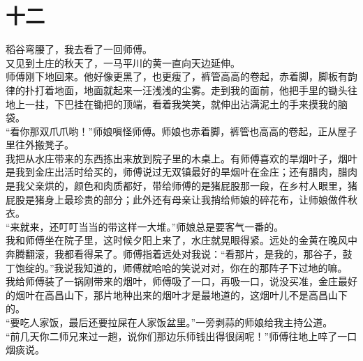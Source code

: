 \fancyhead[RO]{\thepage} %
\fancyhead[LE]{\thepage} %
\fancyfoot[LE,RO]{}
\fancyfoot[LO,CE]{}
\fancyfoot[CO,RE]{}
\chapter*{十二}
稻谷弯腰了，我去看了一回师傅。\\

又见到土庄的秋天了，一马平川的黄一直向天边延伸。\\

师傅刚下地回来。他好像更黑了，也更瘦了，裤管高高的卷起，赤着脚，脚板有韵律的扑打着地面，地面就起来一汪浅浅的尘雾。走到我的面前，他把手里的锄头往地上一拄，下巴挂在锄把的顶端，看着我笑笑，就伸出沾满泥土的手来摸我的脑袋。\\

“看你那双爪爪哟！”师娘嗔怪师傅。师娘也赤着脚，裤管也高高的卷起，正从屋子里往外搬凳子。\\

我把从水庄带来的东西拣出来放到院子里的木桌上。有师傅喜欢的旱烟叶子，烟叶是我到金庄出活时给买的，师傅说过无双镇最好的旱烟叶在金庄；还有腊肉，腊肉是我父亲烘的，颜色和肉质都好，带给师傅的是猪屁股那一段，在乡村人眼里，猪屁股是猪身上最珍贵的部分；此外还有母亲让我捎给师娘的碎花布，让师娘做件秋衣。\\

“来就来，还叮叮当当的带这样一大堆。”师娘总是要客气一番的。\\

我和师傅坐在院子里，这时候夕阳上来了，水庄就晃眼得紧。远处的金黄在晚风中奔腾翻滚，我都看得呆了。师傅指着远处对我说：“看那片，是我的，那谷子，鼓丁饱绽的。”我说我知道的，师傅就哈哈的笑说对对，你在的那阵子下过地的嘛。\\

我给师傅装了一锅刚带来的烟叶，师傅吸了一口，再吸一口，说没买准，金庄最好的烟叶在高昌山下，那片地种出来的烟叶才是最地道的，这烟叶儿不是高昌山下的。\\

“要吃人家饭，最后还要拉屎在人家饭盆里。”一旁剥蒜的师娘给我主持公道。\\

“前几天你二师兄来过一趟，说你们那边乐师钱出得很阔呢！”师傅往地上啐了一口烟痰说。\\

